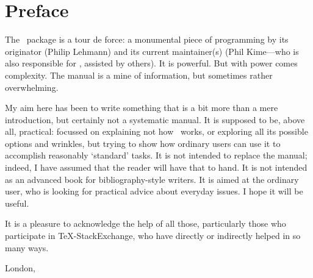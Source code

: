 
\maketitle

\tableofcontents

\chapter{Preface}

The \biblatex\ package is a tour de force: a monumental piece of programming by its originator (Philip Lehmann) and its current maintainer(s) (Phil Kime---who is also responsible for , assisted by others). It is powerful. But with power comes complexity. The manual is a mine of information, but sometimes rather overwhelming.

My aim here has been to write something that is a bit more than a mere introduction, but certainly not a systematic manual. It is supposed to be, above all, practical: focussed on explaining not how \biblatex\ works, or exploring all its possible options and wrinkles, but trying to show how ordinary users can use it to accomplish reasonably `standard' tasks. It is not intended to replace the manual; indeed, I have assumed that the reader will have that to hand. It is not intended as an advanced book for bibliography-style writers. It is aimed at the ordinary user, who is looking for practical advice about everyday issues. I hope it will be useful.

It is a pleasure to acknowledge the help of all those, particularly those who participate in \TeX-StackExchange, who have directly or indirectly helped in so many ways.

\hfill{}

\hfill{London, \prefacedate}

